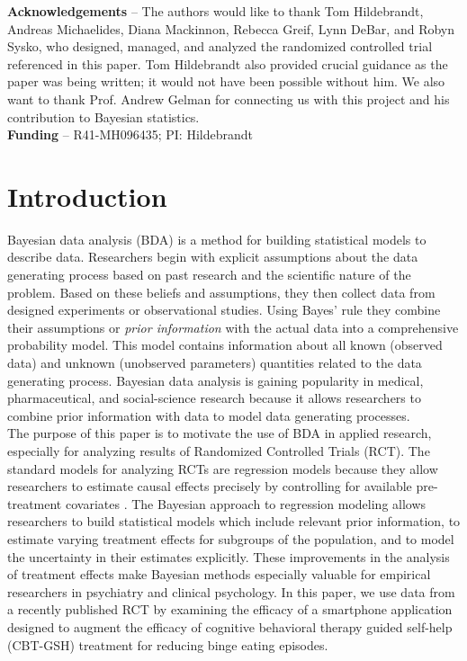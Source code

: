 \documentclass{article}
\begin{document}
\textbf{Acknowledgements} -- The authors would like to thank Tom Hildebrandt,  Andreas Michaelides, Diana Mackinnon, Rebecca Greif, Lynn DeBar, and Robyn Sysko, who designed, managed, and analyzed the randomized controlled trial referenced in this paper.  Tom Hildebrandt also provided crucial guidance as the paper was being written; it would not have been possible without him. We also want to thank Prof. Andrew Gelman for connecting us with this project and his contribution to Bayesian statistics. \\
\textbf{Funding} -- R41-MH096435; PI: Hildebrandt


\newpage

\section*{Introduction}
Bayesian data analysis (BDA) is a method for building statistical models to describe data.  Researchers begin with explicit assumptions about the data generating process based on past research and the scientific nature of the problem. Based on these beliefs and assumptions, they then collect data from designed experiments or observational studies. Using Bayes' rule they combine their assumptions or \textit{prior information} with the actual data into a comprehensive probability model. This model contains information about all known (observed data) and unknown (unobserved parameters) quantities related to the data generating process. Bayesian data analysis is gaining popularity in medical, pharmaceutical, and social-science research because it allows researchers to combine prior information with data to model data generating processes.\\
The purpose of this paper is to motivate the use of BDA in applied research, especially for analyzing results of Randomized Controlled Trials (RCT). The standard models for analyzing RCTs are regression models because they allow researchers to estimate causal effects precisely by controlling for available pre-treatment covariates \cite{gelman2006data}. The Bayesian approach to regression modeling allows researchers to build statistical models which include relevant prior information, to estimate varying treatment effects for subgroups of the population, and to model the uncertainty in their estimates explicitly.  These improvements in the analysis of treatment effects make Bayesian methods especially valuable for empirical researchers in psychiatry and clinical psychology.   In this paper, we use data from a recently published RCT by  examining the efficacy of a smartphone application designed to augment the efficacy of cognitive behavioral therapy guided self-help (CBT-GSH) treatment for reducing binge eating episodes. \\
\end{document}
